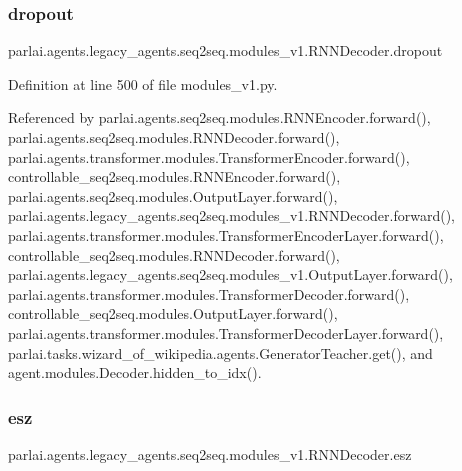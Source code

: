 \subsubsection{\texorpdfstring{dropout}{dropout}}
{\footnotesize\ttfamily parlai.\+agents.\+legacy\+\_\+agents.\+seq2seq.\+modules\+\_\+v1.\+R\+N\+N\+Decoder.\+dropout}



Definition at line 500 of file modules\+\_\+v1.\+py.



Referenced by parlai.\+agents.\+seq2seq.\+modules.\+R\+N\+N\+Encoder.\+forward(), parlai.\+agents.\+seq2seq.\+modules.\+R\+N\+N\+Decoder.\+forward(), parlai.\+agents.\+transformer.\+modules.\+Transformer\+Encoder.\+forward(), controllable\+\_\+seq2seq.\+modules.\+R\+N\+N\+Encoder.\+forward(), parlai.\+agents.\+seq2seq.\+modules.\+Output\+Layer.\+forward(), parlai.\+agents.\+legacy\+\_\+agents.\+seq2seq.\+modules\+\_\+v1.\+R\+N\+N\+Decoder.\+forward(), parlai.\+agents.\+transformer.\+modules.\+Transformer\+Encoder\+Layer.\+forward(), controllable\+\_\+seq2seq.\+modules.\+R\+N\+N\+Decoder.\+forward(), parlai.\+agents.\+legacy\+\_\+agents.\+seq2seq.\+modules\+\_\+v1.\+Output\+Layer.\+forward(), parlai.\+agents.\+transformer.\+modules.\+Transformer\+Decoder.\+forward(), controllable\+\_\+seq2seq.\+modules.\+Output\+Layer.\+forward(), parlai.\+agents.\+transformer.\+modules.\+Transformer\+Decoder\+Layer.\+forward(), parlai.\+tasks.\+wizard\+\_\+of\+\_\+wikipedia.\+agents.\+Generator\+Teacher.\+get(), and agent.\+modules.\+Decoder.\+hidden\+\_\+to\+\_\+idx().

\mbox{\label{classparlai_1_1agents_1_1legacy__agents_1_1seq2seq_1_1modules__v1_1_1RNNDecoder_a6a0beb3ff226d0757b023acd8189366f}} 
\subsubsection{\texorpdfstring{esz}{esz}}
{\footnotesize\ttfamily parlai.\+agents.\+legacy\+\_\+agents.\+seq2seq.\+modules\+\_\+v1.\+R\+N\+N\+Decoder.\+esz}



